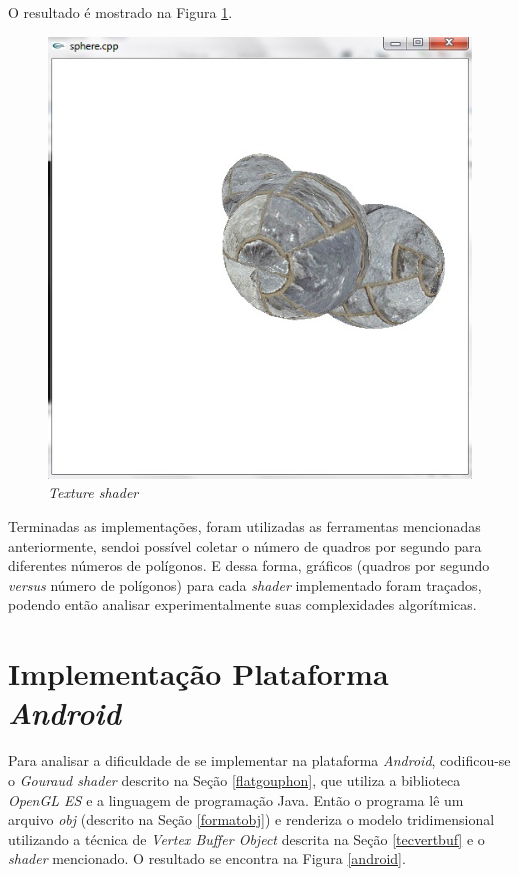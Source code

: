 	

	O resultado é mostrado na  Figura \ref{texture_shader}.

	\begin{figure}[h]
	\centering
		\includegraphics[keepaspectratio=true,scale=0.6]{figuras/texture.jpg}
	\caption{\textit{Texture shader}}
	\label{texture_shader}
	\end{figure}


 	Terminadas as implementações, foram utilizadas as ferramentas mencionadas anteriormente, sendoi possível coletar o número de quadros por segundo para diferentes números de polígonos. E dessa forma, gráficos (quadros por segundo \textit{versus} número de polígonos) para cada \textit{shader} implementado foram traçados, podendo então analisar experimentalmente suas complexidades algorítmicas.

\section{Implementação Plataforma \textit{Android}} 

	Para analisar a dificuldade de se implementar na plataforma \textit{Android}, codificou-se o \textit{Gouraud shader} descrito na Seção \ref{flatgouphon}, que utiliza a biblioteca \textit{OpenGL ES} e a linguagem de programação Java. Então o programa lê um arquivo  \textit{obj} (descrito na Seção \ref{formatobj}) e renderiza o modelo tridimensional utilizando a técnica de \textit{Vertex Buffer Object} descrita na Seção \ref{tecvertbuf} e o \textit{shader} mencionado. O resultado se encontra na  Figura \ref{android}.

